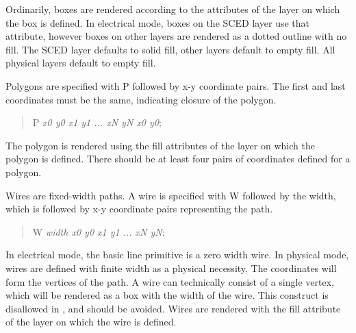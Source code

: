 Ordinarily, boxes are rendered according to the attributes of the
layer on which the box is defined.  In {\Xic} electrical mode, boxes
on the SCED layer use that attribute, however boxes on other layers
are rendered as a dotted outline with no fill.  The SCED layer
defaults to solid fill, other layers default to empty fill.  All
physical layers default to empty fill.

Polygons are specified with {\vt P} followed by x-y coordinate pairs. 
The first and last coordinates must be the same, indicating closure of
the polygon.
\begin{quote}\vt
P {\it x0 y0 x1 y1 ... xN yN x0 y0\/};
\end{quote}
The polygon is rendered using the fill attributes of the layer on which
the polygon is defined.  There should be at least four pairs of
coordinates defined for a polygon.

Wires are fixed-width paths.  A wire is specified with {\vt W}
followed by the width, which is followed by x-y coordinate pairs
representing the path.
\begin{quote}
W {\it width x0 y0 x1 y1 ... xN yN\/};
\end{quote}
In electrical mode, the basic line primitive is a zero width wire.  In
physical mode, wires are defined with finite width as a physical
necessity.  The coordinates will form the vertices of the path.  A
wire can technically consist of a single vertex, which will be
rendered as a box with the width of the wire.  This construct is
disallowed in {\Xic}, and should be avoided.  Wires are rendered with the
fill attribute of the layer on which the wire is defined.


